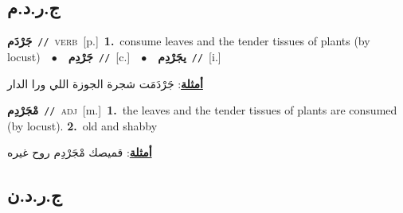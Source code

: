 \documentclass[10pt,a4paper,twoside]{article} %
\begin{document}
\begin{multicols}{2}
\vspace{-3mm}
\subsection*{\color{blue}\foreignlanguage{arabic}{ج.ر.د.م}\color{blue}{}} 

{\setlength\topsep{0pt}\textbf{\foreignlanguage{arabic}{جَرْدَم}}\ {\color{gray}\texttt{//}\color{black}}\ \textsc{verb}\ [p.]\ \textbf{1.}~consume leaves and the tender tissues of plants (by locust)\ \ $\bullet$\ \ \setlength\topsep{0pt}\textbf{\foreignlanguage{arabic}{جَرْدِم}}\ {\color{gray}\texttt{//}\color{black}}\ [c.]\ \ $\bullet$\ \ \setlength\topsep{0pt}\textbf{\foreignlanguage{arabic}{يجَرْدِم}}\ {\color{gray}\texttt{//}\color{black}}\ [i.]\  \begin{flushright}\color{gray}\foreignlanguage{arabic}{\textbf{\underline{\foreignlanguage{arabic}{أمثلة}}}: جَرْدَمَت شجرة الجوزة اللي ورا الدار}\end{flushright}\color{black}} \vspace{2mm}

{\setlength\topsep{0pt}\textbf{\foreignlanguage{arabic}{مْجَرْدِم}}\ {\color{gray}\texttt{//}\color{black}}\ \textsc{adj}\ [m.]\ \textbf{1.}~the leaves and the tender tissues of plants are consumed (by locust).  \textbf{2.}~old and shabby\  \begin{flushright}\color{gray}\foreignlanguage{arabic}{\textbf{\underline{\foreignlanguage{arabic}{أمثلة}}}: قميصك مْجَرْدِم روح غيره}\end{flushright}\color{black}} \vspace{2mm}

\vspace{-3mm}
\subsection*{\color{blue}\foreignlanguage{arabic}{ج.ر.د.ن}\color{blue}{ (ntws)}} 


\end{multicols}
\end{document}
